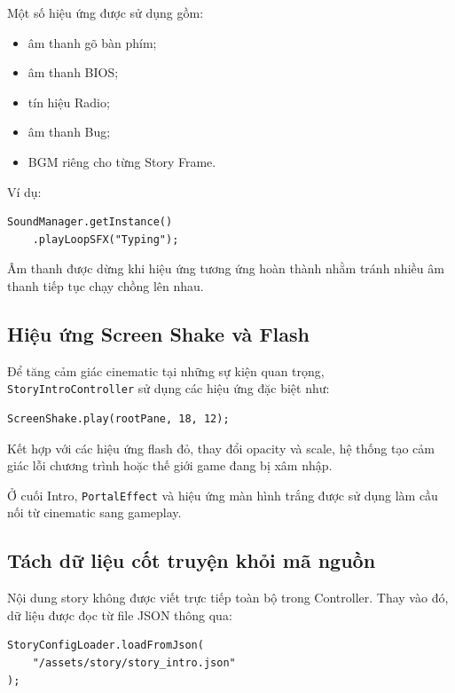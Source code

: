 \documentclass[12pt,a4paper]{report}
\begin{document}
    Một số hiệu ứng được sử dụng gồm:

    \begin{itemize}
        \item âm thanh gõ bàn phím;
        \item âm thanh BIOS;
        \item tín hiệu Radio;
        \item âm thanh Bug;
        \item BGM riêng cho từng Story Frame.
    \end{itemize}

    Ví dụ:

    \begin{verbatim}
SoundManager.getInstance()
    .playLoopSFX("Typing");
    \end{verbatim}

    Âm thanh được dừng khi hiệu ứng tương ứng hoàn thành nhằm tránh
    nhiều âm thanh tiếp tục chạy chồng lên nhau.

    \subsection{Hiệu ứng Screen Shake và Flash}

    Để tăng cảm giác cinematic tại những sự kiện quan trọng,
    \texttt{StoryIntroController} sử dụng các hiệu ứng đặc biệt như:

    \begin{verbatim}
ScreenShake.play(rootPane, 18, 12);
    \end{verbatim}

    Kết hợp với các hiệu ứng flash đỏ, thay đổi opacity và scale,
    hệ thống tạo cảm giác lỗi chương trình hoặc thế giới game
    đang bị xâm nhập.

    Ở cuối Intro, \texttt{PortalEffect} và hiệu ứng màn hình trắng
    được sử dụng làm cầu nối từ cinematic sang gameplay.

    \subsection{Tách dữ liệu cốt truyện khỏi mã nguồn}

    Nội dung story không được viết trực tiếp toàn bộ trong Controller.
    Thay vào đó, dữ liệu được đọc từ file JSON thông qua:

    \begin{verbatim}
StoryConfigLoader.loadFromJson(
    "/assets/story/story_intro.json"
);
    \end{verbatim}
\end{document}
